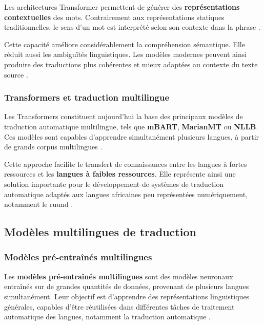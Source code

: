 Les architectures Transformer permettent de générer des \textbf{représentations contextuelles} des mots. Contrairement aux représentations statiques traditionnelles, le sens d'un mot est interprété selon son contexte dans la phrase \cite{vaswani2017attention}.

Cette capacité améliore considérablement la compréhension sémantique. Elle réduit aussi les ambiguïtés linguistiques. Les modèles modernes peuvent ainsi produire des traductions plus cohérentes et mieux adaptées au contexte du texte source \cite{kozhirbayev2024enhancing}.

\subsubsection{Transformers et traduction multilingue}

Les Transformers constituent aujourd'hui la base des principaux modèles de traduction automatique multilingue, tels que \textbf{mBART}, \textbf{MarianMT} ou \textbf{NLLB}. Ces modèles sont capables d'apprendre simultanément plusieurs langues, à partir de grands corpus multilingues \cite{kozhirbayev2024enhancing}.

Cette approche facilite le transfert de connaissances entre les langues à fortes ressources et les \textbf{langues à faibles ressources}. Elle représente ainsi une solution importante pour le développement de systèmes de traduction automatique adaptés aux langues africaines peu représentées numériquement, notamment le ruund \cite{mandiya2026lingala}.

\subsection{Modèles multilingues de traduction}

\subsubsection{Modèles pré-entraînés multilingues}

Les \textbf{modèles pré-entraînés multilingues} sont des modèles neuronaux entraînés sur de grandes quantités de données, provenant de plusieurs langues simultanément. Leur objectif est d'apprendre des représentations linguistiques générales, capables d'être réutilisées dans différentes tâches de traitement automatique des langues, notamment la traduction automatique \cite{ranathunga2023neural}.

